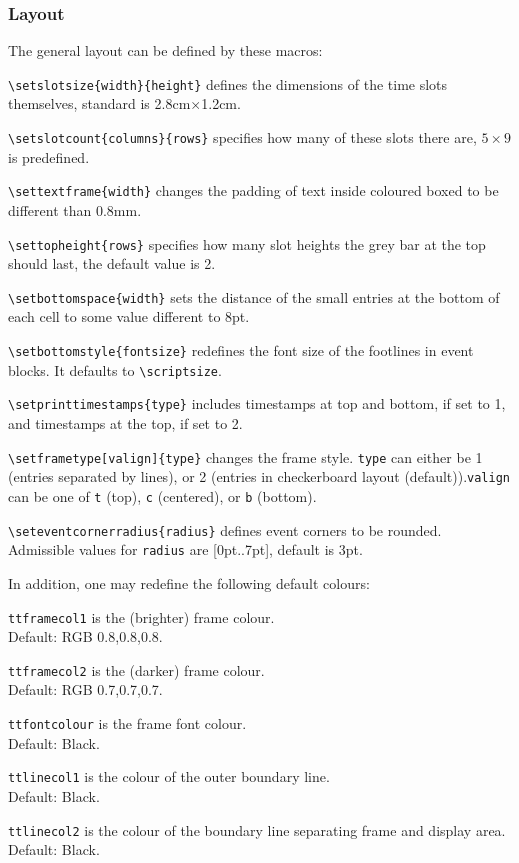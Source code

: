 \documentclass[a4paper,10pt]{article}
\begin{document}
\subsubsection{Layout}
The general layout can be defined by these macros:
\begin{description}
\item \lstinline!\setslotsize{width}{height}! defines the dimensions of the time slots themselves, standard is 2.8cm$\times$1.2cm.
\item \lstinline!\setslotcount{columns}{rows}! specifies how many of these slots there are, $5\times9$ is predefined.
\item \lstinline!\settextframe{width}! changes the padding of text inside coloured boxed to be different than 0.8mm.
\item \lstinline!\settopheight{rows}! specifies how many slot heights the grey bar at the top should last, the default value is 2.
\item \lstinline!\setbottomspace{width}! sets the distance of the small entries at the bottom of each cell to some value different to 8pt.
\item \lstinline!\setbottomstyle{fontsize}! redefines the font size of the footlines in event blocks. It defaults to \lstinline!\scriptsize!.
\item \lstinline!\setprinttimestamps{type}! includes timestamps at top and bottom, if set to 1, and timestamps at the top, if set to 2.
\item \lstinline!\setframetype[valign]{type}! changes the frame style. \texttt{type} can either be 1 (entries separated by lines), or 2 (entries in checkerboard layout (default)).\texttt{valign} can be one of \texttt{t} (top), \texttt{c} (centered), or \texttt{b} (bottom).
\item \lstinline!\seteventcornerradius{radius}! defines event corners to be rounded. Admissible values for \texttt{radius} are [0pt..7pt], default is 3pt.
\end{description}
In addition, one may redefine the following default colours:
\begin{description}
\item \lstinline!ttframecol1! is the (brighter) frame colour.\\ Default: RGB 0.8,0.8,0.8.
\item \lstinline!ttframecol2! is the (darker) frame colour.\\ Default: RGB 0.7,0.7,0.7.
\item \lstinline!ttfontcolour! is the frame font colour.\\ Default: Black.
\item \lstinline!ttlinecol1! is the colour of the outer boundary line.\\ Default: Black.
\item \lstinline!ttlinecol2! is the colour of the boundary line separating frame and display area.\\ Default: Black.
\end{description}
\end{document}
